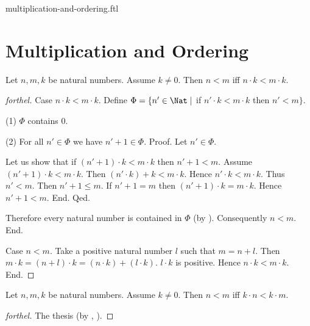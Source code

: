 \documentclass{naproche-library}
\begin{document}
\begin{smodule}{multiplication-and-ordering.ftl}

  \section*{Multiplication and Ordering}

  \begin{proposition}[forthel,id=ARITHMETIC_06_8817333933965312]
    Let $n, m, k$ be natural numbers.
    Assume $k \neq 0$.
    Then $n < m$ iff $n \cdot k < m \cdot k$.
  \end{proposition}
  \begin{proof}[forthel]
    Case $n \cdot k < m \cdot k$.
      Define $\Phi = \{ n' \in \Nat \mid$ if $n' \cdot k < m \cdot k$ then $n' < m \}$.

      (1) $\Phi$ contains $0$.

      (2) For all $n' \in \Phi$ we have $n' + 1 \in \Phi$. \newline
      Proof.
        Let $n' \in \Phi$.

        Let us show that if $(n' + 1) \cdot k < m \cdot k$ then $n' + 1 < m$.
          Assume $(n' + 1) \cdot k < m \cdot k$.
          Then $(n' \cdot k) + k < m \cdot k$.
          Hence $n' \cdot k < m \cdot k$.
          Thus $n' < m$.
          Then $n' + 1 \leq m$.
          If $n' + 1 = m$ then $(n' + 1) \cdot k = m \cdot k$.
          Hence $n' + 1 < m$.
        End.
      Qed.

      Therefore every natural number is contained in $\Phi$ (by ).
      Consequently $n < m$.
    End.

    Case $n < m$.
      Take a positive natural number $l$ such that $m = n + l$.
      Then $m \cdot k = (n + l) \cdot k = (n \cdot k) + (l \cdot k)$.
      $l \cdot k$ is positive.
      Hence $n \cdot k < m \cdot k$.
    End.
  \end{proof}

  \begin{corollary}[forthel,id=ARITHMETIC_06_5048640368279552]
    Let $n, m, k$ be natural numbers.
    Assume $k \neq 0$.
    Then $n < m$ iff $k \cdot n < k \cdot m$.
  \end{corollary}
  \begin{proof}[forthel]
    The thesis (by , ).
  \end{proof}


\end{smodule}
\end{document}

